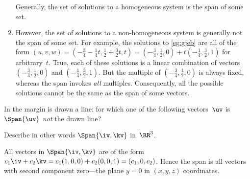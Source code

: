 \begin{example}
\begin{enumerate}
Generally, the set of solutions to a homogeneous system is the span of some set.

\item However, the set of solutions to a non-homogeneous system is generally not the span of some set.  
For example, the solutions to \autoref{eg:gjeb} are all of the form \((u,v,w)=(-\frac34-\frac14t,\frac12+\frac32t,t) 
=(-\frac34,\frac12,0)+t(-\frac14,\frac32,1)\) for arbitrary~\(t\).
True, each of these solutions is a linear combination of vectors \((-\frac34,\frac12,0)\) and \((-\frac14,\frac32,1)\). 
But the multiple of \((-\frac34,\frac12,0)\) is always fixed, whereas the span invokes \emph{all} multiples.
Consequently, all the possible solutions cannot be the same as the span of some vectors.


\end{enumerate}
\end{example}



\begin{activity}
In the margin is drawn a line: 
%
for which one of the following vectors~\(\uv\) is \(\Span\{\uv\}\) \emph{not} the drawn line?
\end{activity}



\begin{example} \label{eg:}
Describe in other words \(\Span\{\iv,\kv\}\) in~\(\RR^3\).

\begin{solution} 
All vectors in \(\Span\{\iv,\kv\}\) are of the form
\(c_1\iv+c_2\kv
=c_1(1,0,0)+c_2(0,0,1)
=(c_1,0,c_2)\).
Hence the span is all vectors with second component zero---the plane \(y=0\) in \((x,y,z)\) coordinates.
\end{solution}
\end{example}




